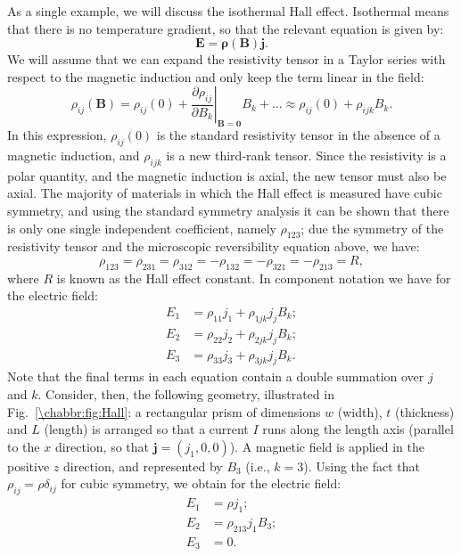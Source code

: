 As a single example, we will discuss the isothermal Hall effect.  Isothermal means that there is no temperature gradient, so that the relevant equation is given by:
\begin{equation}
	\mathbf{E} = \bm{\rho}(\mathbf{B})\mathbf{j}.
\end{equation}
We will assume that we can expand the resistivity tensor in a Taylor series with respect to the magnetic induction and only keep the term linear in the field:
\[
	\rho_{ij}(\mathbf{B}) = \rho_{ij}(0) + \left.\frac{\partial \rho_{ij}}{\partial B_k}\right\vert_{\mathbf{B}=\mathbf{0}} B_k + \ldots \approx \rho_{ij}(0) + \rho_{ijk}B_k.
\]
In this expression, $\rho_{ij}(0)$ is the standard resistivity tensor in the absence of a magnetic induction, and $\rho_{ijk}$ is a new third-rank tensor. Since the resistivity is a polar quantity, and the magnetic induction is axial, the new tensor must also be axial.  The majority of materials in which the Hall effect is measured have cubic symmetry, and using the standard symmetry analysis it can be shown that there is only one single independent coefficient, namely $\rho_{123}$; due the symmetry of the resistivity tensor and the microscopic reversibility equation above, we have:
\[
	\rho_{123} = \rho_{231} = \rho_{312} = -\rho_{132} = -\rho_{321} = -\rho_{213} = R,
\]
where $R$ is known as the Hall effect constant.  In component notation we have for the electric field:
\begin{align*}
	E_1 &= \rho_{11} j_1 + \rho_{1jk}j_jB_k;\\
	E_2 &= \rho_{22} j_2 + \rho_{2jk}j_jB_k;\\
	E_3 &= \rho_{33} j_3 + \rho_{3jk}j_jB_k.
\end{align*}
Note that the final terms in each equation contain a double summation over $j$ and $k$. Consider, then, the following geometry, illustrated in Fig.~\ref{\chabbr:fig:Hall}:  a rectangular prism of dimensions $w$ (width), $t$ (thickness) and $L$ (length) is arranged so that a current $I$ runs along the length axis (parallel to the $x$ direction, so that $\mathbf{j}=(j_1,0,0)$).  A magnetic field is applied in the positive $z$ direction, and represented by $B_3$ (i.e., $k=3$).  Using the fact that $\rho_{ij} = \rho\delta_{ij}$ for cubic symmetry, we obtain for the electric field:
\begin{align*}
	E_1 &= \rho j_1;\\
	E_2 &= \rho_{213}j_1B_3;\\
	E_3 &= 0.
\end{align*}
